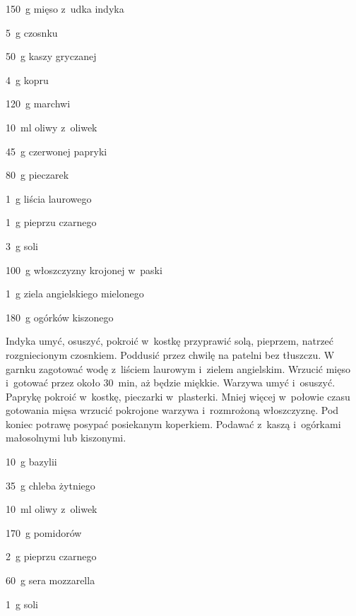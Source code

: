 \documentclass[../main.tex]{subfiles}
\begin{document}
\begin{Ingred}
    \item \qty{150}{\gram} mięso z~udka indyka
    \item \qty{5}{\gram} czosnku
    \item \qty{50}{\gram} kaszy gryczanej
    \item \qty{4}{\gram} kopru
    \item \qty{120}{\gram} marchwi
    \item \qty{10}{\milli\litre} oliwy z~oliwek
    \item \qty{45}{\gram} czerwonej papryki
    \item \qty{80}{\gram} pieczarek
    \item \qty{1}{\gram} liścia laurowego
    \item \qty{1}{\gram} pieprzu czarnego
    \item \qty{3}{\gram} soli
    \item \qty{100}{\gram} włoszczyzny krojonej w~paski
    \item \qty{1}{\gram} ziela angielskiego mielonego
    \item \qty{180}{\gram} ogórków kiszonego
\end{Ingred}

Indyka umyć, osuszyć, pokroić w~kostkę przyprawić solą, pieprzem, natrzeć
rozgniecionym czosnkiem. Poddusić przez chwilę na patelni bez tłuszczu. W
garnku zagotować wodę z~liściem laurowym i~zielem angielskim. Wrzucić mięso
i~gotować przez około \qty{30}{\minute}, aż będzie miękkie. Warzywa umyć
i~osuszyć. Paprykę pokroić w~kostkę, pieczarki w~plasterki. Mniej więcej
w~połowie czasu gotowania mięsa wrzucić pokrojone warzywa i~rozmrożoną
włoszczyznę. Pod koniec potrawę posypać posiekanym koperkiem. Podawać z~kaszą
i~ogórkami małosolnymi lub kiszonymi.


\begin{Ingred}
    \item \qty{10}{\gram} bazylii
    \item \qty{35}{\gram} chleba żytniego
    \item \qty{10}{\milli\litre} oliwy z~oliwek
    \item \qty{170}{\gram} pomidorów
    \item \qty{2}{\gram} pieprzu czarnego
    \item \qty{60}{\gram} sera mozzarella
    \item \qty{1}{\gram} soli
\end{Ingred}
\end{document}

